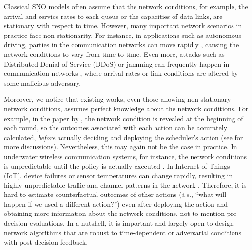 \documentclass[11pt,fullpage,letterpaper]{article} %
\begin{document}
Classical SNO models often assume that the {network conditions}, for example, the arrival and service rates to each queue or the capacities of data links, are stationary with respect to time. However,  many important network scenarios in practice face non-stationarity. For instance, in applications such as autonomous driving, parties in the communication networks can move rapidly \citep{ashjaei2021time}, causing the network conditions to vary from time to time. Even more, attacks such as Distributed Denial-of-Service (DDoS) or jamming can frequently happen in communication networks \citep{zou2016survey}, where arrival rates or link conditions are altered by some malicious adversary.

Moreover, we notice that existing works, even those allowing non-stationary network conditions, assumes {perfect knowledge} about the network conditions. For example, in the paper by \citet{liang2018minimizing}, the network condition is revealed at the beginning of each round, so the outcomes associated with each action can be accurately calculated, \textit{before} actually deciding and deploying the scheduler's action (see  for more discussions).
Nevertheless, this may again not be the case in practice.  In underwater wireless communication systems, for instance, the network conditions is unpredictable until the policy is actually executed \citep{khan2020channel}. In Internet of Things (IoT), device failures or sensor temperatures can change rapidly, resulting in highly unpredictable  traffic and channel patterns in the network \citep{gaddam2020detecting}.
Therefore, it is hard to estimate {counterfactual} outcomes of other actions (\textit{i.e.}, ``what will happen if we used a different action?'') even after deploying the action and obtaining more information about the network conditions, not to mention pre-decision evaluations.
In a nutshell, it is important and largely open to design network algorithms that are robust to time-dependent or adversarial conditions with post-decision feedback. 
\end{document}
